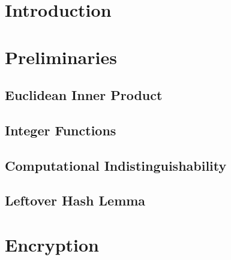 \documentclass{article}
\begin{document}

\newpage

\tableofcontents
\newpage

\section{Introduction}


\newpage

\section{Preliminaries}



\subsection{Euclidean Inner Product}


\subsection{Integer Functions}


\subsection{Computational Indistinguishability}


\subsection{Leftover Hash Lemma}



\section{Encryption}


\end{document}
